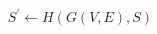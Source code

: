 \begin{frame}
\begin{columns}[T]
\begin{column}{.3\textwidth}
    \end{column}
    \begin{column}{.3\textwidth}
        \begin{algorithm}[H]
            \SetAlFnt{\tiny}
            \SetAlCapFnt{\small}
            \SetAlCapNameFnt{\small}
            \SetAlgoLined
            \DontPrintSemicolon
            \LinesNumbered
            \SetAlgoLined
            \BlankLine
            \BlankLine
            $S^\prime \gets H(G(V,E),S)$ \\
        \caption{$ConjEnv(G(V,E),S)$}   
        \end{algorithm}
    \end{column}
  \end{columns}
\end{frame}

